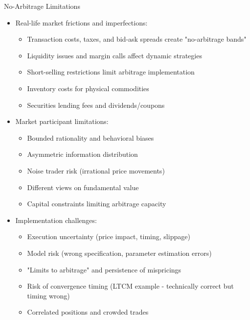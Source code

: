 \documentclass[10pt]{beamer}
\begin{document}
\begin{frame}{No-Arbitrage Limitations}
  \begin{itemize}[<+->]
    \item Real-life market frictions and imperfections:
      \begin{itemize}
        \item Transaction costs, taxes, and bid-ask spreads create "no-arbitrage bands"
        \item Liquidity issues and margin calls affect dynamic strategies
        \item Short-selling restrictions limit arbitrage implementation
        \item Inventory costs for physical commodities
        \item Securities lending fees and dividends/coupons
      \end{itemize}
      
    \item Market participant limitations:
      \begin{itemize}
        \item Bounded rationality and behavioral biases
        \item Asymmetric information distribution
        \item Noise trader risk (irrational price movements)
        \item Different views on fundamental value
        \item Capital constraints limiting arbitrage capacity
      \end{itemize}
      
    \item Implementation challenges:
      \begin{itemize}
        \item Execution uncertainty (price impact, timing, slippage)
        \item Model risk (wrong specification, parameter estimation errors)
        \item "Limits to arbitrage" and persistence of mispricings
        \item Risk of convergence timing (LTCM example - technically correct but timing wrong)
        \item Correlated positions and crowded trades
      \end{itemize}
  \end{itemize}
\end{frame}
\end{document}
